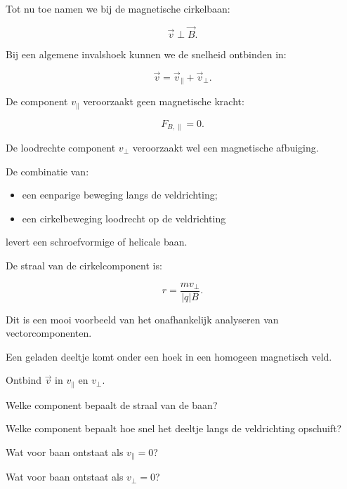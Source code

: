 \documentclass{ximera}
\begin{document}


Tot nu toe namen we bij de magnetische cirkelbaan:

\[
\vec v\perp\vec B.
\]

Bij een algemene invalshoek kunnen we de snelheid ontbinden in:

\[
\vec v=\vec v_\parallel+\vec v_\perp.
\]

De component $v_\parallel$ veroorzaakt geen magnetische kracht:

\[
F_{B,\parallel}=0.
\]

De loodrechte component $v_\perp$ veroorzaakt wel een magnetische
afbuiging.

De combinatie van:

\begin{itemize}
  \item een eenparige beweging langs de veldrichting;
  \item een cirkelbeweging loodrecht op de veldrichting
\end{itemize}

levert een schroefvormige of helicale baan.

De straal van de cirkelcomponent is:

\[
\boxed{
r=\frac{mv_\perp}{|q|B}.
}
\]

Dit is een mooi voorbeeld van het onafhankelijk analyseren van
vectorcomponenten.


\begin{oefening}{\oefG}

Een geladen deeltje komt onder een hoek in een homogeen magnetisch veld.

\begin{question}
Ontbind $\vec v$ in $v_\parallel$ en $v_\perp$.
\end{question}

\begin{question}
Welke component bepaalt de straal van de baan?
\end{question}

\begin{question}
Welke component bepaalt hoe snel het deeltje langs de veldrichting
opschuift?
\end{question}

\begin{question}
Wat voor baan ontstaat als $v_\parallel=0$?
\end{question}

\begin{question}
Wat voor baan ontstaat als $v_\perp=0$?
\end{question}

\end{oefening}
\end{document}
